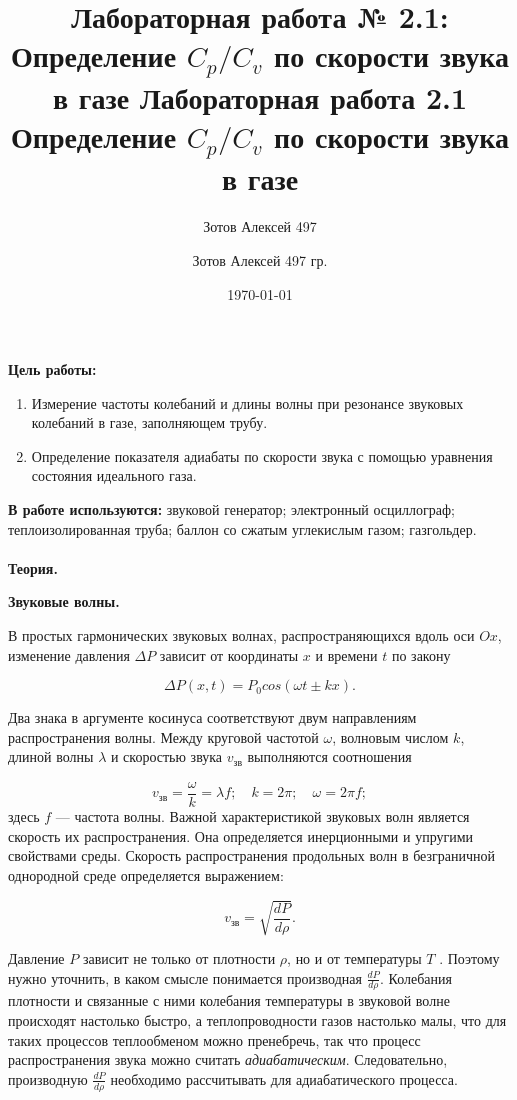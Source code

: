 \documentclass[10pt]{article}
\title{Лабораторная работа № 2.1:
    Определение $C_p/C_v$ по скорости звука в газе    
}
\date{\today}
\author{Зотов Алексей 497}
\begin{document}
        \author {Зотов Алексей 497 гр.}
    \title {Лабораторная работа 2.1 \\  Определение $C_{p}/C_{v}$ по скорости звука в газе}
    \maketitle{}   

    \indent
    \textbf{Цель работы:}
         \begin{enumerate}
         \item Измерение частоты колебаний и длины волны при резонансе звуковых колебаний в газе, заполняющем трубу. 
         \item Определение показателя адиабаты по скорости звука с помощью уравнения состояния идеального газа.
         \end{enumerate}
    \indent
        
        \textbf{В работе используются:} звуковой генератор; электронный осциллограф; теплоизолированная труба; баллон со сжатым углекислым газом; газгольдер. \\ \\


    \textbf{Теория.}

    \textbf{Звуковые волны.} 

    \small{В простых гармонических звуковых волнах, распространяющихся вдоль оси $Ox$, изменение давления $\Delta P$ зависит от координаты $x$ и времени $t$ по закону

    \begin{equation}
        \Delta P(x,t) = P_0 cos(\omega t \pm kx).
    \end{equation}

    Два знака в аргументе косинуса соответствуют двум направлениям распространения волны. Между круговой частотой $\omega$, волновым числом $k$, длиной волны $\lambda$ и скоростью звука $v_\text{зв}$ выполняются соотношения

    \begin{equation}
        v_\text{зв} = \frac{\omega}{k} = \lambda f; \quad k = 2\pi; \quad \omega = 2\pi f;
    \end{equation}
    здесь $f$ — частота волны.
    Важной характеристикой звуковых волн является скорость их
    распространения. Она определяется инерционными и упругими свойствами среды. Скорость распространения продольных волн в безграничной однородной среде определяется выражением:
     
    \begin{equation}
        v_\text{зв} = \sqrt{\frac{dP}{d\rho}}.
    \end{equation}

    Давление $P$ зависит не только от плотности $\rho$, но и от температуры $T$ . Поэтому нужно уточнить, в каком смысле понимается производная $\frac{dP}{d\rho}$.
    Колебания плотности и связанные с ними колебания температуры в звуковой волне происходят настолько быстро, а теплопроводности газов настолько малы, что для таких процессов теплообменом можно пренебречь, так что процесс распространения звука можно считать \textit{адиабатическим}. Следовательно, производную $\frac{dP}{d\rho}$ необходимо рассчитывать для адиабатического процесса.
    }
\end{document}
